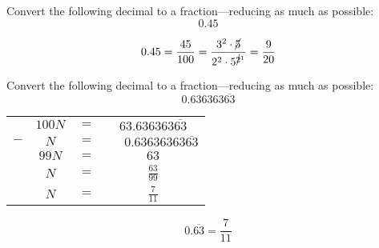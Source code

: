 \documentclass[11pt,letterpaper]{article}
\begin{document}
\newpage



 Convert the following decimal to a fraction---reducing as much as possible:
	\[
	0.45
	\] \pspace

\sol
	\[
	0.45= \dfrac{45}{100}= \dfrac{3^2 \cdot \cancel{5}}{2^2 \cdot 5^{\cancel{2}^1}}= \dfrac{9}{20}
	\]



\newpage



 Convert the following decimal to a fraction---reducing as much as possible:
	\[
	0.636363\overline{63}
	\] \pspace

\sol \par
	\begin{table}[!ht]
	\centering\small
	\begin{tabular}{rccc}
	& $100N$ & $=$ & $63.636363\overline{63}$ \\ 
	$-$ & $N$ & $=$ & $\phantom{63.}0.63636363\overline{63}$ \\ \hline
	& $99N$ & $=$ & $63$ \\[0.1cm]
	& $N$ & $=$ & $\frac{63}{99}$ \\[0.1cm]
	& $N$ & $=$ & $\frac{7}{11}$
	\end{tabular}
	\end{table} \par

	\[
	0.\overline{63}= \dfrac{7}{11}
	\]
\end{document}
